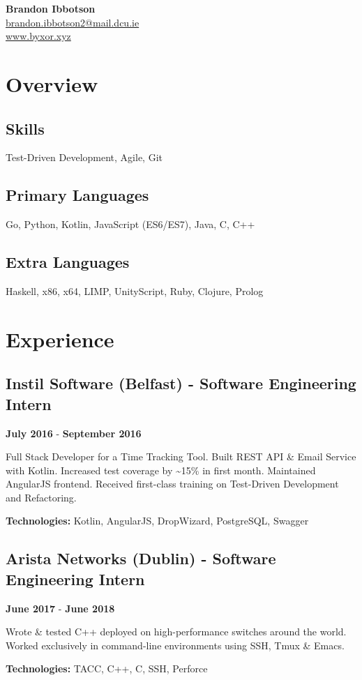 \documentclass{article}
\newcommand{\youremail}[1]{\href{mailto:#1}{#1}}
\newcommand{\yourtitle}[3]{
  \begin{center}
    {\huge\bfseries #1}\\
    \vspace{.5em}
    \youremail{#2}\\
    \url{#3}\\
    \vspace{.7em}
  \end{center}
}
\begin{document}
\yourtitle{Brandon Ibbotson}{brandon.ibbotson2@mail.dcu.ie}{www.byxor.xyz}
\section{Overview}
\subsection{Skills}
Test-Driven Development, Agile, Git
\subsection{Primary Languages}
Go, Python, Kotlin, JavaScript (ES6/ES7), Java, C, C++
\subsection{Extra Languages}
Haskell, x86, x64, LIMP, UnityScript, Ruby, Clojure, Prolog
\section{Experience}
\subsection{Instil Software (Belfast) - Software Engineering Intern}
\textbf{July 2016} - \textbf{September 2016}

Full Stack Developer for a Time Tracking Tool. Built REST API \& Email Service with Kotlin. Increased test coverage by \textasciitilde{}15\% in first month. Maintained AngularJS frontend. Received first-class training on Test-Driven Development and Refactoring.

\textbf{Technologies: }Kotlin, AngularJS, DropWizard, PostgreSQL, Swagger
\vspace{0.5em}\subsection{Arista Networks (Dublin) - Software Engineering Intern}
\textbf{June 2017} - \textbf{June 2018}

Wrote \& tested C++ deployed on high-performance switches around the world. Worked exclusively in command-line environments using SSH, Tmux \& Emacs. 

\textbf{Technologies: }TACC, C++, C, SSH, Perforce
\vspace{0.5em}
\end{document}

